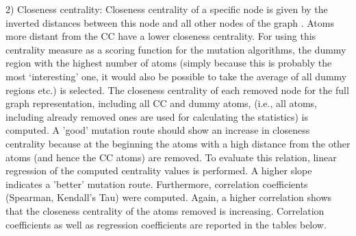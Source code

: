 2) Closeness centrality: Closeness centrality of a specific node is
given by the inverted distances between this node and all other nodes
of the graph \cite{Newman.2010}. Atoms more distant from the CC have a lower
closeness centrality.
For using this centrality measure as a scoring function for the mutation
algorithms, the dummy region with the highest number of atoms (simply
because this is probably the most \textquoteleft interesting\textquoteright{}
one, it would also be possible to take the average of all dummy regions
etc.) is selected. The closeness centrality of each removed node for
the full graph representation, including all CC and dummy atoms, (i.e., all atoms, including already removed ones are used for calculating the statistics) is
computed. A 'good' mutation route should show an increase in closeness
centrality because at the beginning the atoms with a high distance
from the other atoms (and hence the CC atoms) are removed.
To evaluate this relation, linear regression of the computed centrality
values is performed. A higher slope indicates a 'better' mutation
route. Furthermore, correlation coefficients (Spearman, Kendall's
Tau) were computed. Again, a higher correlation shows that the
closeness centrality of the atoms removed is increasing. Correlation
coefficients as well as regression coefficients are reported in the
tables below.

